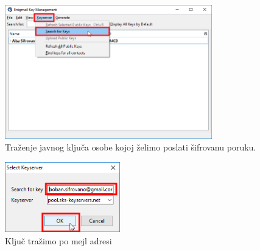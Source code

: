 \documentclass[a4paper,11pt]{article}
\begin{document}
\begin{figure}[!h]
	\begin{center}
		\includegraphics[width=9cm]{47_keymanagment_searchforkey.png}
		\caption{Tra\v{z}enje javnog klju\v{c}a osobe kojoj \v{z}elimo poslati \v{s}ifrovanu poruku.}
		\label{search_for_pubkey2}
	\end{center}
\end{figure}
\newpage
\begin{figure}[!h]
	\begin{center}
		\includegraphics[width=5cm]{48_keymanagment_searchforkey.png}
		\caption{Klju\v{c} tra\v{z}imo po mejl adresi}
		\label{search_for_pubkey3}
	\end{center}
\end{figure}
\end{document}
